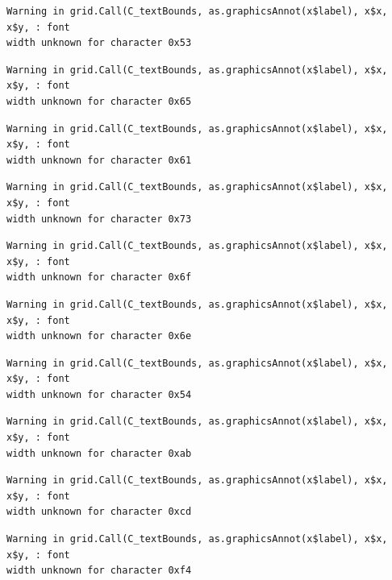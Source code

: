 \documentclass[
  letterpaper,
  DIV=11,
  numbers=noendperiod]{scrreprt}
\begin{document}
\begin{verbatim}
Warning in grid.Call(C_textBounds, as.graphicsAnnot(x$label), x$x, x$y, : font
width unknown for character 0x53
\end{verbatim}

\begin{verbatim}
Warning in grid.Call(C_textBounds, as.graphicsAnnot(x$label), x$x, x$y, : font
width unknown for character 0x65
\end{verbatim}

\begin{verbatim}
Warning in grid.Call(C_textBounds, as.graphicsAnnot(x$label), x$x, x$y, : font
width unknown for character 0x61
\end{verbatim}

\begin{verbatim}
Warning in grid.Call(C_textBounds, as.graphicsAnnot(x$label), x$x, x$y, : font
width unknown for character 0x73
\end{verbatim}

\begin{verbatim}
Warning in grid.Call(C_textBounds, as.graphicsAnnot(x$label), x$x, x$y, : font
width unknown for character 0x6f
\end{verbatim}

\begin{verbatim}
Warning in grid.Call(C_textBounds, as.graphicsAnnot(x$label), x$x, x$y, : font
width unknown for character 0x6e
\end{verbatim}

\begin{verbatim}
Warning in grid.Call(C_textBounds, as.graphicsAnnot(x$label), x$x, x$y, : font
width unknown for character 0x54
\end{verbatim}

\begin{verbatim}
Warning in grid.Call(C_textBounds, as.graphicsAnnot(x$label), x$x, x$y, : font
width unknown for character 0xab
\end{verbatim}

\begin{verbatim}
Warning in grid.Call(C_textBounds, as.graphicsAnnot(x$label), x$x, x$y, : font
width unknown for character 0xcd
\end{verbatim}

\begin{verbatim}
Warning in grid.Call(C_textBounds, as.graphicsAnnot(x$label), x$x, x$y, : font
width unknown for character 0xf4
\end{verbatim}
\end{document}
